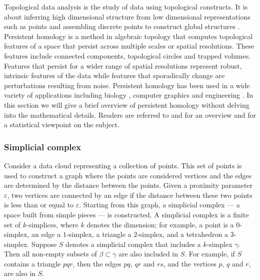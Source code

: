 \documentclass[11pt,a4paper,]{article}
\theoremstyle{definition}
\theoremstyle{definition}
\theoremstyle{definition}
\theoremstyle{remark}
\begin{document}
Topological data analysis is the study of data using topological constructs. It is about inferring high dimensional structure from low dimensional representations such as points and assembling discrete points to construct global structures \autocite{ghrist2008barcodes}. Persistent homology is a method in algebraic topology that computes topological features of a space that persist across multiple scales or spatial resolutions. These features include connected components, topological circles and trapped volumes. Features that persist for a wider range of spatial resolutions represent robust, intrinsic features of the data while features that sporadically change are perturbations resulting from noise. Persistent homology has been used in a wide variety of applications including biology \autocite{topaz2015topological}, computer graphics \autocite{carlsson2008local} and engineering \autocite{perea2015sliding}. In this section we will give a brief overview of persistent homology without delving into the mathematical details. Readers are referred to \textcite{ghrist2008barcodes} and \textcite{Carlsson2009} for an overview and \textcite{wasserman2018topological} for a statistical viewpoint on the subject.

\hypertarget{simplicial-complex}{%
\subsubsection*{Simplicial complex}\label{simplicial-complex}}

Consider a data cloud representing a collection of points. This set of points is used to construct a graph where the points are considered vertices and the edges are determined by the distance between the points. Given a proximity parameter \(\varepsilon\), two vertices are connected by an edge if the distance between these two points is less than or equal to \(\varepsilon\). Starting from this graph, a simplicial complex --- a space built from simple pieces --- is constructed. A simplicial complex is a finite set of \(k\)-simplices, where \(k\) denotes the dimension; for example, a point is a \(0\)-simplex, an edge a \(1\)-simplex, a triangle a \(2\)-simplex, and a tetrahedron a \(3\)-simplex. Suppose \(S\) denotes a simplicial complex that includes a \(k\)-simplex \(\gamma\). Then all non-empty subsets of \(\beta \subset \gamma\) are also included in \(S\). For example, if \(S\) contains a triangle \(pqr\), then the edges \(pq\), \(qr\) and \(rs\), and the vertices \(p\), \(q\) and \(r\), are also in \(S\).
\end{document}
